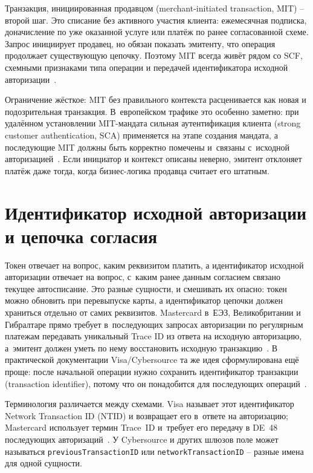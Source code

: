 Транзакция, инициированная продавцом (merchant-initiated transaction,
MIT) -- второй шаг. Это списание без активного участия клиента:
ежемесячная подписка, доначисление по уже оказанной услуге или
платёж по ранее согласованной схеме. Запрос инициирует продавец,
но обязан показать эмитенту, что операция продолжает существующую
цепочку. Поэтому MIT всегда живёт рядом со SCF, схемными признаками
типа операции и передачей идентификатора исходной
авторизации~\cite{mc-tpr,cybs-mc-subscription-mit}.

Ограничение жёсткое: MIT без правильного контекста расценивается
как новая и подозрительная транзакция. В~европейском трафике это
особенно заметно: при удалённом установлении MIT-мандата сильная
аутентификация клиента (strong customer authentication, SCA)
применяется на этапе создания мандата, а последующие MIT должны быть
корректно помечены и~связаны с~исходной
авторизацией~\cite{eba-mit-qa,mc-tpr}. Если инициатор и контекст
описаны неверно, эмитент отклоняет платёж даже тогда, когда
бизнес-логика продавца считает его штатным.

\section{Идентификатор исходной авторизации и цепочка согласия}\label{sec:subscriptions-ntid}

Токен отвечает на вопрос, каким реквизитом платить, а идентификатор
исходной авторизации отвечает на вопрос, с~каким ранее данным
согласием связано текущее автосписание. Это разные
сущности, и смешивать их опасно: токен можно обновить при перевыпуске
карты, а идентификатор цепочки должен храниться отдельно от самих
реквизитов. Mastercard в~ЕЭЗ, Великобритании и Гибралтаре прямо требует
в~последующих запросах авторизации по регулярным платежам передавать
уникальный Trace ID из ответа на исходную авторизацию, а~эмитент должен
уметь по нему восстановить исходную транзакцию~\cite{mc-tpr}. В
практической документации Visa/Cybersource та же идея сформулирована
ещё проще: после начальной операции нужно сохранить идентификатор
транзакции (transaction identifier), потому что он понадобится для
последующих операций~\cite{cybs-initial-transactions}.

Терминология различается между схемами. Visa называет
этот идентификатор Network Transaction ID (NTID) и
возвращает его в~ответе на авторизацию; Mastercard использует
термин Trace~ID и~требует его передачу в DE~48 последующих
авторизаций~\cite{mc-tpr,cybs-initial-transactions}. У
Cybersource и других шлюзов поле может называться
\texttt{previousTransactionID} или
\texttt{networkTransactionID} -- разные имена для одной
сущности.

